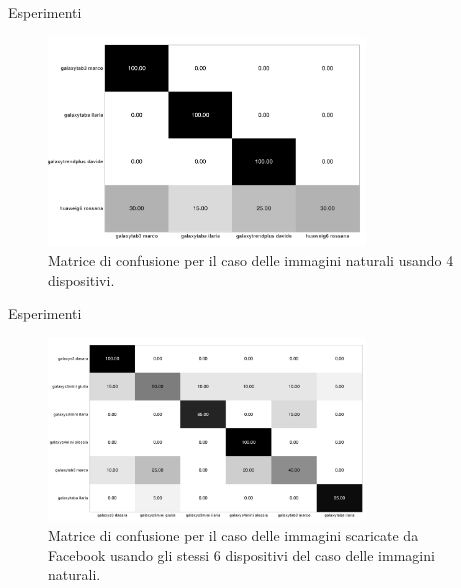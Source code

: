 \begin{tframe}{Esperimenti}

\begin{figure}[h]
\begin{center}
\includegraphics[width=0.75\textwidth]{../images/confusionmatrix_nat_4.png}
\end{center}
  \caption{Matrice di confusione per il caso delle immagini naturali usando 4 dispositivi.}
\label{fig:validation}
\end{figure}

\end{tframe}

\begin{tframe}{Esperimenti}

\begin{figure}[h]
\begin{center}
\includegraphics[width=0.75\textwidth]{../images/confusion_matrix_fb_highres_6.png}
\end{center}
  \caption{Matrice di confusione per il caso delle immagini scaricate da Facebook usando gli stessi 6 dispositivi del caso delle immagini naturali.}
\label{fig:validation}
\end{figure}

\end{tframe}

